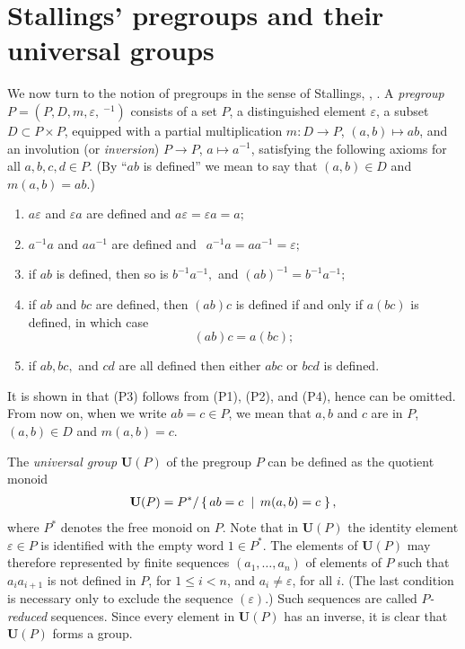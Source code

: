 \documentclass[a4paper]{article}
\newcommand\eps{\varepsilon}
\newcommand{\Uvec}{\mathbf{U}}	%
\newcommand{\UP}{\Uvec(P)}
\newcommand{\set}[2]{\left\{\, \mathinner{#1}\vphantom{#2}\; \left|\; \vphantom{#1}\mathinner{#2} \right.\,\right\}}
\theoremstyle{plain}
\theoremstyle{definition}
\begin{document}
\section{Stallings' pregroups and their universal groups}
\label{sec:pregroup}

We now turn to the notion of pregroups in the sense of Stallings,
\cite{Stallings_1971}, \cite{Stallings_1987}.
A \emph{pregroup} $P=(P,D,m,\eps,~^{-1})$ consists of a set $P$,  a distinguished element
$\eps$, a subset $D\subset P\times P$,  
equipped with  a partial multiplication %
$m:D \to P$, $(a,b) \mapsto ab$, 
and an involution (or \emph{inversion}) %
$P \to P$, $a \mapsto a^{-1}$, satisfying the following axioms
for all $a,b,c,d \in P$. (By ``$ab$ is defined'' we mean to say that
$(a,b)\in D$ and $m(a,b)=ab$.)
\begin{enumerate}[(P1)]
\item  %
$a \eps$ and $\eps  a$ are defined and
$a \eps = \eps a = a;$
\item  %
$a^{-1} a$ and $a a^{-1}$ are defined and $ \ \
a^{-1} a = a a^{-1} = \eps;$
\item  %
if $ a b$ is defined, then so is
$b^{-1} a^{-1},$ and
$(a  b)^{-1} = b^{-1} a^{-1};$
\item  \label{it:P4}%
if $a  b$ and $b
c$ are defined, then $(a b) c$ is defined if and only if $a (b
c)$ is defined, in which case
$$ (a b) c =  a (b c);$$
\item   \label{it:P5} %
if $a  b, b  c,$ and $c  d$
are all defined then either $a  b  c$ or $b
c  d$ is defined.
\end{enumerate}
It is shown in \cite{Hoare_1988}
that (P3) follows from (P1), (P2), and (P4), hence can be omitted.
From now on, when we write $ab=c\in P$, we mean that $a,b$ and $c$ are in $P$, 
$(a,b)\in D$ and $m(a,b)=c$. 

The \emph{universal group}  $\UP$  of the pregroup $P$ can be defined as the quotient
monoid
\begin{align*}
\UP = %
P^*/\set{ab=c}{m(a,b)=c},
\end{align*}
where $P^*$ denotes the free monoid on $P$. Note that in $\UP$ the identity element 
$\eps \in P$ is identified
 with the empty word $1 \in P^*$.
The elements of $\UP$ may
therefore represented by
finite sequences $(a_1, \ldots, a_n)$ of elements
of $P$ such that $a_ia_{i+1}$ is not defined in $P$, for $1\leq
i<n$, and $a_i\neq \eps$, for all $i$. (The last condition
is necessary only to exclude the sequence $(\eps)$.)  
Such sequences are called {\em $P$-reduced} sequences.
Since every element in $\UP$ has an inverse, it is clear that
$\UP$ forms a group. 
\end{document}
